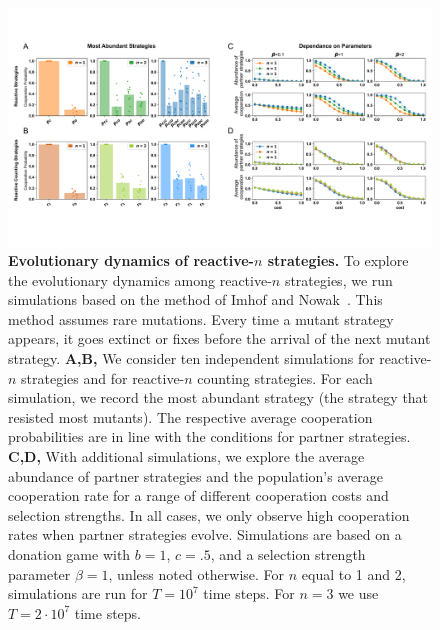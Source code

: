 \documentclass[11pt]{article}
\begin{document}
\begin{figure}[t]
  \centering
  \includegraphics[width=\textwidth]{figures/abundant_strategies.pdf}
  \caption{\textbf{Evolutionary dynamics of reactive-$n$ strategies.}
  To explore the evolutionary dynamics among reactive-$n$ strategies, we run simulations based on the
  method of Imhof and Nowak~\cite{imhof:royal:2010}. 
  This method assumes rare mutations. 
  Every time a mutant strategy appears, it goes extinct or fixes before the arrival of the next mutant strategy. 
  {\bf A,B,} We consider ten independent simulations for reactive-$n$ strategies and for reactive-$n$ counting strategies. 
  For each simulation, we record the most abundant strategy (the strategy that resisted most mutants). 
  The respective average cooperation probabilities are in line with the conditions for partner strategies. 
  {\bf C,D,} With additional simulations, we explore the average abundance of partner strategies and the population's average cooperation rate for a range of different cooperation costs and selection strengths. 
  In all cases, we only observe high cooperation rates when partner strategies evolve. 
 Simulations are based on a donation game with \(b\!=\!1\),  \(c\!=\!.5\), and a selection strength parameter $\beta\!=\!1$, unless noted otherwise.     For $n$ equal to 1
  and 2, simulations are run for \(T\!=\! 10 ^ 7\) time steps. For $n\!=\!3$ we use \(T\!=\! 2 \!\cdot\!10 ^ 7\) time steps.}\label{fig:evolutionary_results}
\end{figure}
\end{document}
